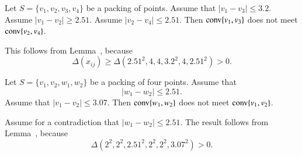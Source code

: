 \begin{tarskidata}
\begin{tarski}

\begin{lemma}
Let $S=\{v_1,v_2,v_3,v_4\}$ be a packing of points.
  Assume that
	$|v_1-v_3|\le 3.2$.  Assume $|v_1-v_2|\ge 2.51$.
Assume $|v_2-v_4|\le 2.51$.
Then ${\operatorname{conv}}\{v_1,v_3\}$ does not meet
${\operatorname{conv}}\{v_2,v_4\}$.
\end{lemma}


\begin{proved}  This follows from Lemma~,
because    
   $$
    \Delta(x_{ij})\ge \Delta(2.51^2,4,4,3.2^2,4,2.51^2)>0.
    $$
\swallowed\end{proved}
\end{tarski}


    


\begin{tarski}

\begin{lemma}
Let $S=\{v_1,v_2,w_1,w_2\}$ be a packing of four points.
Assume that
	$$|w_1-w_2|\le 2.51.$$
Assume that $|v_1-v_2|\le 3.07$.  
Then
${\operatorname{conv}}\{w_1,w_2\}$ does not meet ${\operatorname{conv}}\{v_1,v_2\}$.
\end{lemma}


\begin{proved}
Assume for a contradiction that $|w_1-w_2|\le2.51$.
The result follows from  Lemma~,
because 
    $$
    \Delta(2^2,2^2,2.51^2,2^2,2^2,3.07^2) > 0.
    $$
\swallowed\end{proved}
\end{tarski}





\begin{tarski}


\end{tarski}
\end{tarskidata}
